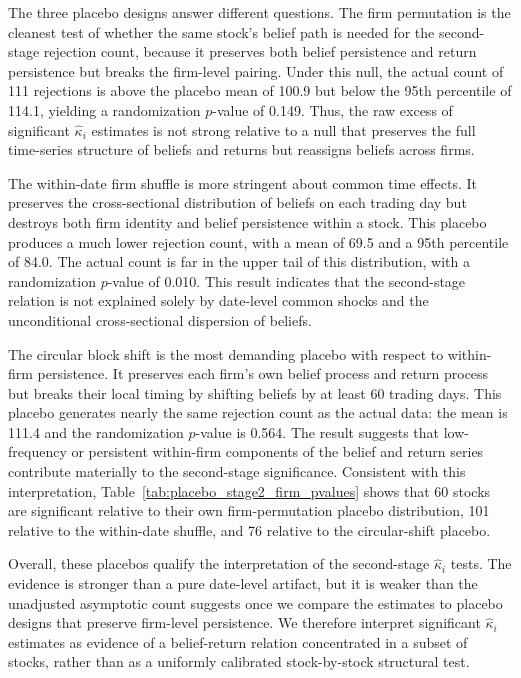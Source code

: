 The three placebo designs answer different questions.
The firm permutation is the cleanest test of whether the same stock's belief path is needed for the second-stage rejection count, because it preserves both belief persistence and return persistence but breaks the firm-level pairing.
Under this null, the actual count of 111 rejections is above the placebo mean of 100.9 but below the 95th percentile of 114.1, yielding a randomization $p$-value of 0.149.
Thus, the raw excess of significant $\hat\kappa_i$ estimates is not strong relative to a null that preserves the full time-series structure of beliefs and returns but reassigns beliefs across firms.

The within-date firm shuffle is more stringent about common time effects.
It preserves the cross-sectional distribution of beliefs on each trading day but destroys both firm identity and belief persistence within a stock.
This placebo produces a much lower rejection count, with a mean of 69.5 and a 95th percentile of 84.0.
The actual count is far in the upper tail of this distribution, with a randomization $p$-value of 0.010.
This result indicates that the second-stage relation is not explained solely by date-level common shocks and the unconditional cross-sectional dispersion of beliefs.

The circular block shift is the most demanding placebo with respect to within-firm persistence.
It preserves each firm's own belief process and return process but breaks their local timing by shifting beliefs by at least 60 trading days.
This placebo generates nearly the same rejection count as the actual data: the mean is 111.4 and the randomization $p$-value is 0.564.
The result suggests that low-frequency or persistent within-firm components of the belief and return series contribute materially to the second-stage significance.
Consistent with this interpretation, Table~\ref{tab:placebo_stage2_firm_pvalues} shows that 60 stocks are significant relative to their own firm-permutation placebo distribution, 101 relative to the within-date shuffle, and 76 relative to the circular-shift placebo.

Overall, these placebos qualify the interpretation of the second-stage $\hat\kappa_i$ tests.
The evidence is stronger than a pure date-level artifact, but it is weaker than the unadjusted asymptotic count suggests once we compare the estimates to placebo designs that preserve firm-level persistence.
We therefore interpret significant $\hat\kappa_i$ estimates as evidence of a belief-return relation concentrated in a subset of stocks, rather than as a uniformly calibrated stock-by-stock structural test.
